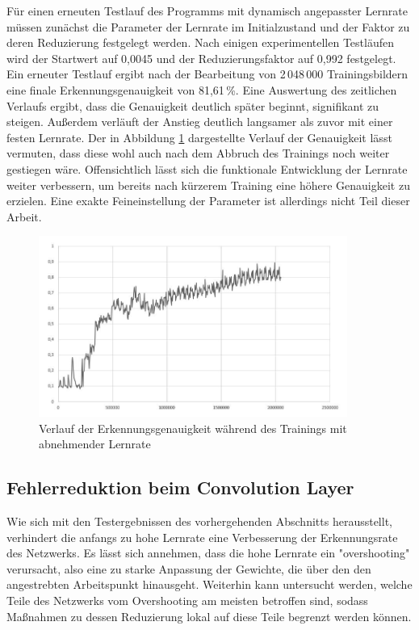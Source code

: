 \documentclass[../main.tex]{subfiles}
\begin{document}
Für einen erneuten Testlauf des Programms mit dynamisch angepasster Lernrate müssen zunächst die Parameter der Lernrate im Initialzustand und der Faktor zu deren Reduzierung festgelegt werden. Nach einigen experimentellen Testläufen wird der Startwert auf 0,0045 und der Reduzierungsfaktor auf 0,992 festgelegt. Ein erneuter Testlauf  ergibt nach der Bearbeitung von 2\,048\,000 Trainingsbildern eine finale Erkennungsgenauigkeit von 81,61\,\%. Eine Auswertung des zeitlichen Verlaufs ergibt, dass die Genauigkeit deutlich später beginnt, signifikant zu steigen. Außerdem verläuft der Anstieg deutlich langsamer als zuvor mit einer festen Lernrate. Der in Abbildung \ref{pic:diagram_lr_decreasing} dargestellte Verlauf der Genauigkeit lässt vermuten, dass diese wohl auch nach dem Abbruch des Trainings noch weiter gestiegen wäre. Offensichtlich lässt sich die funktionale Entwicklung der Lernrate weiter verbessern, um bereits nach kürzerem Training eine höhere Genauigkeit zu erzielen. Eine exakte Feineinstellung der Parameter ist allerdings nicht Teil dieser Arbeit. 
\begin{figure}
	\centering 
	\includegraphics[width=0.9\textwidth]{../images/Schmidt/decreasing_lr.jpg} 
	\caption {Verlauf der Erkennungsgenauigkeit während des Trainings mit abnehmender Lernrate} 
	\label{pic:diagram_lr_decreasing} 
\end{figure} 

\subsection{Fehlerreduktion beim Convolution Layer}
Wie sich  mit den Testergebnissen des vorhergehenden Abschnitts herausstellt, verhindert die anfangs zu hohe Lernrate eine Verbesserung der Erkennungsrate des Netzwerks. Es lässt sich annehmen, dass die hohe Lernrate ein "overshooting" verursacht, also eine zu starke Anpassung der Gewichte, die über den den angestrebten Arbeitspunkt hinausgeht. Weiterhin kann untersucht werden, welche Teile des Netzwerks vom Overshooting am meisten betroffen sind, sodass Maßnahmen zu dessen Reduzierung lokal auf diese Teile begrenzt werden können. 
\end{document}
